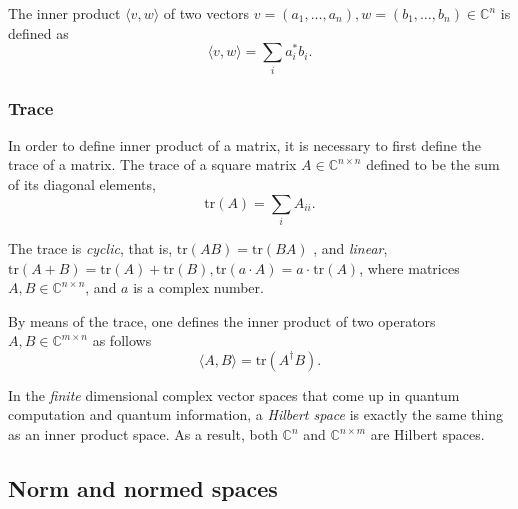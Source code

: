 The inner product $ \langle v, w \rangle$ of two vectors $ v = (a_1, \ldots, a_n ),w = (b_1, \ldots, b_n) \in \mathbb{C}^{n}$ is defined as
\begin{equation*}
  \langle v, w \rangle = \sum_{i} a_i^{\ast} b_i. 
\end{equation*}


\subsubsection{Trace}

In order to define inner product of a matrix, it is necessary to first define the trace of a matrix. The trace of a square matrix $A\in \mathbb{C}^{n\times n}$ defined to be the sum of its diagonal elements,
\begin{equation*}
  \text{tr}(A)= \sum_{i} A_{ii}.
\end{equation*}

The trace is \emph{cyclic}, that is, $\text{tr}(AB) = \text{tr}(BA)$ , and \emph{linear}, $\text{tr}(A + B) = \text{tr}(A)+\text{tr}(B), \text{tr}(a \cdot A) = a\cdot \hspace{1pt} \text{tr}(A)$, where matrices $A, B \in \mathbb{C}^{n\times n}$, and $a$ is a complex number.

By means of the trace, one defines the inner product of two operators $A,B\in \mathbb{C}^{m \times n}$ as follows
\begin{equation*}
  \langle A, B \rangle = \text{tr}(A^{\dagger}B).
\end{equation*}

In the \emph{finite} dimensional complex vector spaces that come up in quantum computation and quantum information, a \emph{Hilbert space} is exactly the same thing as an inner product space.  As a result, both $\mathbb{C}^{n}$ and $\mathbb{C}^{n \times m}$ are Hilbert spaces.

\subsection{Norm and normed spaces}

